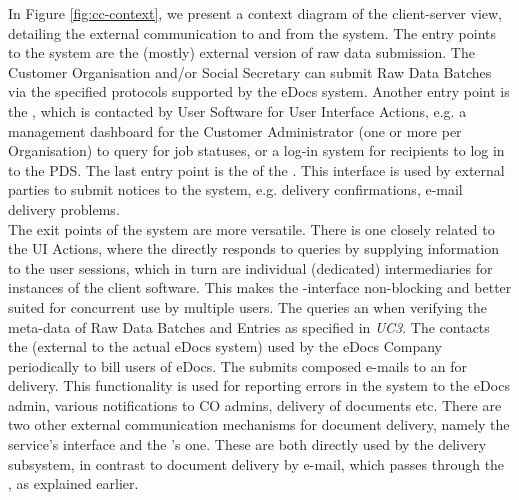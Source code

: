 In Figure \ref{fig:cc-context}, we present a context diagram of the client-server view, detailing the external communication to and from the system. The entry points to the system are the (mostly) external version of raw data submission. The Customer Organisation and/or Social Secretary can submit Raw Data Batches via the specified protocols supported by the eDocs system.
Another entry point is the , which is contacted by User Software for User Interface Actions, e.g. a management dashboard for the Customer Administrator (one or more per Organisation) to query for job statuses, or a log-in system for recipients to log in to the PDS.
The last entry point is the  of the . This interface is used by external parties to submit notices to the system, e.g. delivery confirmations, e-mail delivery problems.\\
The exit points of the system are more versatile. There is one closely related to the UI Actions, where the  directly responds to queries by supplying information to the user sessions, which in turn are individual (dedicated) intermediaries for instances of the client software. This makes the -interface non-blocking and better suited for concurrent use by multiple users.
The  queries an  when verifying the meta-data of Raw Data Batches and Entries as specified in \emph{UC3}.
The  contacts the  (external to the actual eDocs system) used by the eDocs Company periodically to bill users of eDocs.
The  submits composed e-mails to an  for delivery. This functionality is used for reporting errors in the system to the eDocs admin, various notifications to CO admins, delivery of documents etc.
There are two other external communication mechanisms for document delivery, namely the  service's  interface and the 's one. These are both directly used by the delivery subsystem, in contrast to document delivery by e-mail, which passes through the , as explained earlier.

